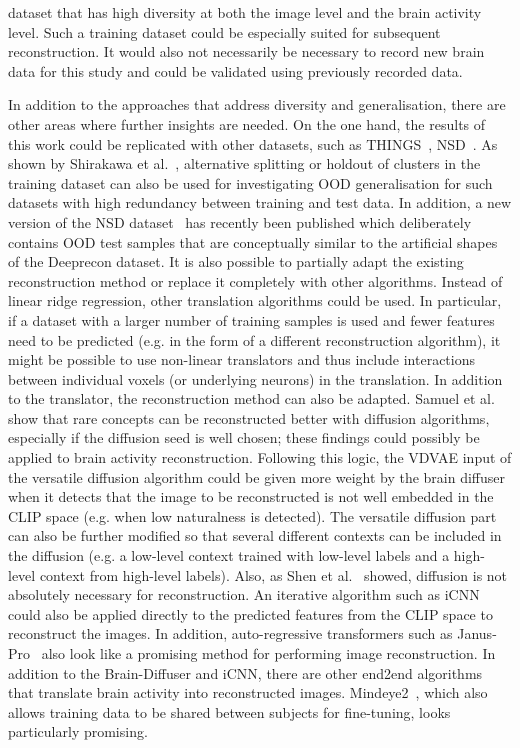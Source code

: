 dataset that has high diversity at both the image level and the brain activity level. Such a training dataset could be especially suited for subsequent reconstruction. It would also not necessarily be necessary to record new brain data for this study and could be validated using previously recorded data.

In addition to the approaches that  address diversity and generalisation, there are other areas where further insights are needed. On the one hand, the results of this work could be replicated with other datasets, such as THINGS~\cite{hebartTHINGSdataMultimodalCollection2023}, NSD~\cite{allenMassive7TFMRI2022}. As shown by Shirakawa et al.~\cite{shirakawaSpuriousReconstructionBrain2024}, alternative splitting or holdout of clusters in the training dataset can also be used for investigating OOD generalisation for such datasets with high redundancy between training and test data. In addition, a new version of the NSD dataset~\cite{gifford7TFMRIDataset2025} has recently been published which deliberately contains OOD test samples that are conceptually similar to the artificial shapes of the Deeprecon dataset. It is also possible to partially adapt the existing reconstruction method or replace it completely with other algorithms. Instead of linear ridge regression, other translation algorithms could be used. In particular, if a dataset with a larger number of training samples is used and fewer features need to be predicted (e.g. in the form of a different reconstruction algorithm), it might be possible to use non-linear translators and thus include interactions between individual voxels (or underlying neurons) in the translation. In addition to the translator, the reconstruction method can also be adapted. Samuel et al.~\cite{samuelGeneratingImagesRare2024} show that rare concepts can be reconstructed better with diffusion algorithms, especially if the diffusion seed is well chosen; these findings could possibly be applied to brain activity reconstruction. Following this logic, the VDVAE input of the versatile diffusion algorithm could be given more weight by the brain diffuser when it detects that the image to be reconstructed is not well embedded in the CLIP space (e.g. when low naturalness is detected). The versatile diffusion part can also be further modified so that several different contexts can be included in the diffusion (e.g. a low-level context trained with low-level labels and a high-level context from high-level labels). Also, as Shen et al.~\cite{shenDeepImageReconstruction2019} showed, diffusion is not absolutely necessary for reconstruction. An iterative algorithm such as iCNN could also be applied directly to the predicted features from the CLIP space to reconstruct the images. In addition, auto-regressive transformers such as Janus-Pro~\cite{chenJanusproUnifiedMultimodal2025} also look like a promising method for performing image reconstruction. In addition to the Brain-Diffuser and iCNN, there are other end2end algorithms that translate brain activity into reconstructed images. Mindeye2~\cite{scottiMindEye2SharedSubjectModels2024}, which also allows training data to be shared between subjects for fine-tuning, looks particularly promising.


